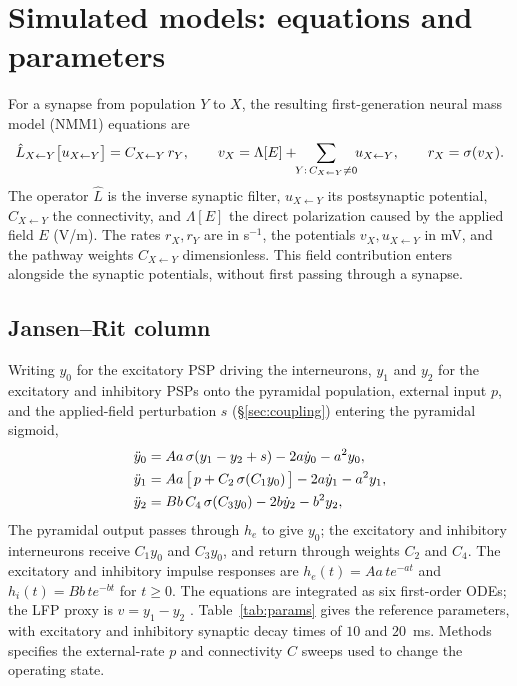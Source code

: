 \section{Simulated models: equations and parameters}\label{app:models}
For a synapse from population $Y$ to $X$, the resulting first-generation neural
mass model (NMM1) equations are
\cite{ruffini2025rosetta}
\begin{equation}
\hat L_{X\leftarrow Y}\big[u_{X\leftarrow Y}\big]=C_{X\leftarrow Y}\,r_Y,\qquad
v_X=\Lambda[E]+\!\!\sum_{Y:\,C_{X\leftarrow Y}\neq0}\!\!u_{X\leftarrow Y},\qquad
r_X=\sigma(v_X).
\label{eq:nmm1}
\end{equation}
The operator $\hat L$ is the inverse synaptic filter, $u_{X\leftarrow Y}$ its
postsynaptic potential, $C_{X\leftarrow Y}$ the connectivity, and $\Lambda[E]$
the direct polarization caused by the applied field $E$ (V/m). The rates $r_X,r_Y$
are in s$^{-1}$, the potentials $v_X,u_{X\leftarrow Y}$ in mV, and the
pathway weights $C_{X\leftarrow Y}$ dimensionless. This field contribution enters
alongside the synaptic potentials, without first passing through a synapse.

\subsection*{Jansen--Rit column}
Writing $y_0$ for the excitatory PSP driving the interneurons, $y_1$ and $y_2$ for the
excitatory and inhibitory PSPs onto the pyramidal population, external input $p$, and the
applied-field perturbation $s$ (\S\ref{sec:coupling}) entering the pyramidal sigmoid,
\begin{align}
\ddot y_0 &= Aa\,\sigma(y_1-y_2+s)-2a\dot y_0-a^2 y_0, \label{eq:jr0}\\
\ddot y_1 &= Aa\,\big[\,p+C_2\,\sigma(C_1 y_0)\,\big]-2a\dot y_1-a^2 y_1,\\
\ddot y_2 &= Bb\,C_4\,\sigma(C_3 y_0)-2b\dot y_2-b^2 y_2,
\end{align}
The pyramidal output passes through $h_e$ to give $y_0$; the excitatory
and inhibitory interneurons receive $C_1y_0$ and $C_3y_0$, and return through
weights $C_2$ and $C_4$. The excitatory and inhibitory impulse responses are
$h_e(t)=Aa\,t e^{-at}$ and $h_i(t)=Bb\,t e^{-bt}$ for $t\ge0$.
The equations are integrated as six first-order ODEs; the LFP proxy is $v=y_1-y_2$ \cite{jansen1995}.
Table~\ref{tab:params} gives the reference parameters, with excitatory and
inhibitory synaptic decay times of $10$ and $20$~ms. Methods specifies the
external-rate $p$ and connectivity $C$ sweeps used to change the operating state.


